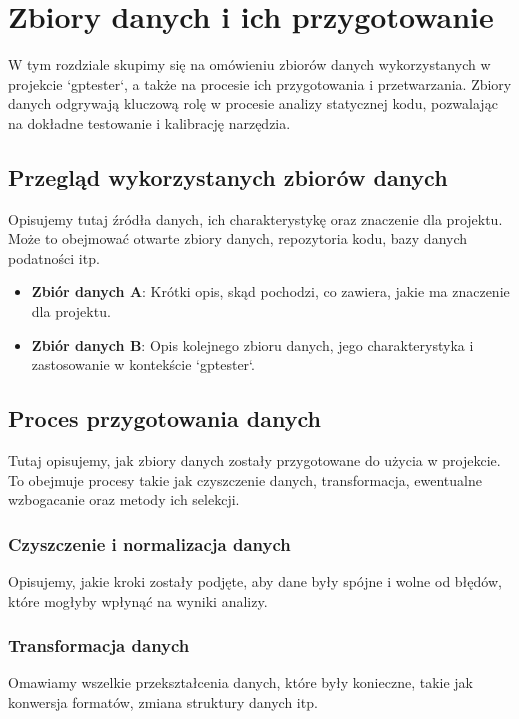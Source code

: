 \chapter{Zbiory danych i ich przygotowanie}
\label{ch:zbiory_danych}

W tym rozdziale skupimy się na omówieniu zbiorów danych wykorzystanych w projekcie `gptester`, a także na procesie ich przygotowania i przetwarzania. Zbiory danych odgrywają kluczową rolę w procesie analizy statycznej kodu, pozwalając na dokładne testowanie i kalibrację narzędzia.

\section{Przegląd wykorzystanych zbiorów danych}
\label{sec:przeglad_zbiorow}

Opisujemy tutaj źródła danych, ich charakterystykę oraz znaczenie dla projektu. Może to obejmować otwarte zbiory danych, repozytoria kodu, bazy danych podatności itp.

\begin{itemize}
    \item \textbf{Zbiór danych A}: Krótki opis, skąd pochodzi, co zawiera, jakie ma znaczenie dla projektu.
    \item \textbf{Zbiór danych B}: Opis kolejnego zbioru danych, jego charakterystyka i zastosowanie w kontekście `gptester`.
\end{itemize}

\section{Proces przygotowania danych}
\label{sec:proces_przygotowania_danych}

Tutaj opisujemy, jak zbiory danych zostały przygotowane do użycia w projekcie. To obejmuje procesy takie jak czyszczenie danych, transformacja, ewentualne wzbogacanie oraz metody ich selekcji.

\subsection{Czyszczenie i normalizacja danych}
Opisujemy, jakie kroki zostały podjęte, aby dane były spójne i wolne od błędów, które mogłyby wpłynąć na wyniki analizy.

\subsection{Transformacja danych}
Omawiamy wszelkie przekształcenia danych, które były konieczne, takie jak konwersja formatów, zmiana struktury danych itp.

